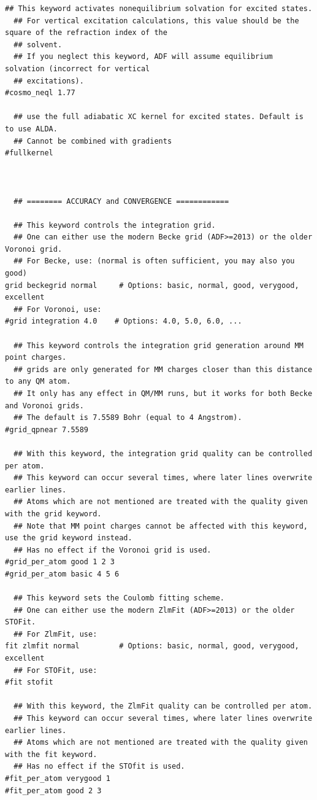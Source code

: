 \documentclass[a4paper,11pt,DIV=15,openany]{scrbook}
\begin{document}
\begin{oframed}
\begin{Verbatim}[commandchars=\\\{\}]
  ## This keyword activates nonequilibrium solvation for excited states.
  ## For vertical excitation calculations, this value should be the square of the refraction index of the 
  ## solvent.
  ## If you neglect this keyword, ADF will assume equilibrium solvation (incorrect for vertical 
  ## excitations).
#cosmo_neql 1.77

  ## use the full adiabatic XC kernel for excited states. Default is to use ALDA.
  ## Cannot be combined with gradients
#fullkernel



  ## ======== ACCURACY and CONVERGENCE ============

  ## This keyword controls the integration grid.
  ## One can either use the modern Becke grid (ADF>=2013) or the older Voronoi grid.
  ## For Becke, use: (normal is often sufficient, you may also you good)
grid beckegrid normal     # Options: basic, normal, good, verygood, excellent
  ## For Voronoi, use:
#grid integration 4.0    # Options: 4.0, 5.0, 6.0, ...

  ## This keyword controls the integration grid generation around MM point charges.
  ## grids are only generated for MM charges closer than this distance to any QM atom.
  ## It only has any effect in QM/MM runs, but it works for both Becke and Voronoi grids.
  ## The default is 7.5589 Bohr (equal to 4 Angstrom).
#grid_qpnear 7.5589

  ## With this keyword, the integration grid quality can be controlled per atom.
  ## This keyword can occur several times, where later lines overwrite earlier lines.
  ## Atoms which are not mentioned are treated with the quality given with the grid keyword.
  ## Note that MM point charges cannot be affected with this keyword, use the grid keyword instead.
  ## Has no effect if the Voronoi grid is used.
#grid_per_atom good 1 2 3
#grid_per_atom basic 4 5 6

  ## This keyword sets the Coulomb fitting scheme.
  ## One can either use the modern ZlmFit (ADF>=2013) or the older STOFit.
  ## For ZlmFit, use:
fit zlmfit normal         # Options: basic, normal, good, verygood, excellent
  ## For STOFit, use:
#fit stofit

  ## With this keyword, the ZlmFit quality can be controlled per atom.
  ## This keyword can occur several times, where later lines overwrite earlier lines.
  ## Atoms which are not mentioned are treated with the quality given with the fit keyword.
  ## Has no effect if the STOfit is used.
#fit_per_atom verygood 1
#fit_per_atom good 2 3


\end{Verbatim}
\end{oframed}
\end{document}
